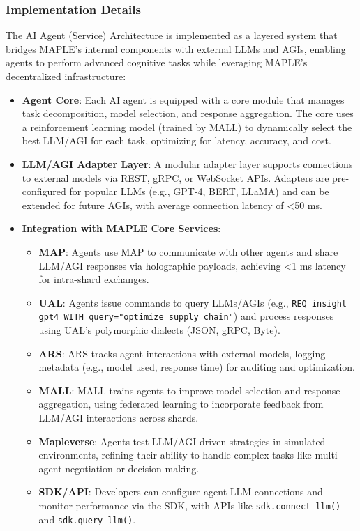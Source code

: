 \documentclass[a4paper,11pt]{article}
\begin{document}
\subsubsection{Implementation Details}
The AI Agent (Service) Architecture is implemented as a layered system that bridges MAPLE’s internal components with external LLMs and AGIs, enabling agents to perform advanced cognitive tasks while leveraging MAPLE’s decentralized infrastructure:
\begin{itemize}[leftmargin=*]
    \item \textbf{Agent Core}: Each AI agent is equipped with a core module that manages task decomposition, model selection, and response aggregation. The core uses a reinforcement learning model (trained by MALL) to dynamically select the best LLM/AGI for each task, optimizing for latency, accuracy, and cost.
    \item \textbf{LLM/AGI Adapter Layer}: A modular adapter layer supports connections to external models via REST, gRPC, or WebSocket APIs. Adapters are pre-configured for popular LLMs (e.g., GPT-4, BERT, LLaMA) and can be extended for future AGIs, with average connection latency of <50 ms.
    \item \textbf{Integration with MAPLE Core Services}:
    \begin{itemize}[leftmargin=1em]
        \item \textbf{MAP}: Agents use MAP to communicate with other agents and share LLM/AGI responses via holographic payloads, achieving <1 ms latency for intra-shard exchanges.
        \item \textbf{UAL}: Agents issue commands to query LLMs/AGIs (e.g., \texttt{REQ insight gpt4 WITH query="optimize supply chain"}) and process responses using UAL’s polymorphic dialects (JSON, gRPC, Byte).
        \item \textbf{ARS}: ARS tracks agent interactions with external models, logging metadata (e.g., model used, response time) for auditing and optimization.
        \item \textbf{MALL}: MALL trains agents to improve model selection and response aggregation, using federated learning to incorporate feedback from LLM/AGI interactions across shards.
        \item \textbf{Mapleverse}: Agents test LLM/AGI-driven strategies in simulated environments, refining their ability to handle complex tasks like multi-agent negotiation or decision-making.
        \item \textbf{SDK/API}: Developers can configure agent-LLM connections and monitor performance via the SDK, with APIs like \texttt{sdk.connect\_llm()} and \texttt{sdk.query\_llm()}.

\end{itemize}
\end{itemize}
\end{document}
